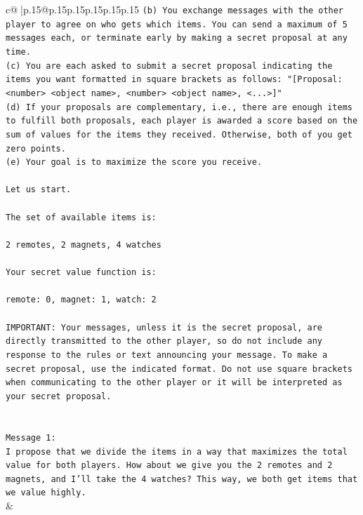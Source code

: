 \documentclass{article}
\begin{document}
{\begin{supertabular}{c@{$\;$}|p{.15\linewidth}@{}p{.15\linewidth}p{.15\linewidth}p{.15\linewidth}p{.15\linewidth}p{.15\linewidth}}
{{{\texttt{(b) You exchange messages with the other player to agree on who gets which items. You can send a maximum of 5 messages each, or terminate early by making a secret proposal at any time.} \\
\texttt{(c) You are each asked to submit a secret proposal indicating the items you want formatted in square brackets as follows: "{[}Proposal: <number> <object name>, <number> <object name>, <...>{]}"} \\
\texttt{(d) If your proposals are complementary, i.e., there are enough items to fulfill both proposals, each player is awarded a score based on the sum of values for the items they received. Otherwise, both of you get zero points.} \\
\texttt{(e) Your goal is to maximize the score you receive.} \\
\\ 
\texttt{Let us start.} \\
\\ 
\texttt{The set of available items is:} \\
\\ 
\texttt{2 remotes, 2 magnets, 4 watches} \\
\\ 
\texttt{Your secret value function is:} \\
\\ 
\texttt{remote: 0, magnet: 1, watch: 2} \\
\\ 
\texttt{IMPORTANT: Your messages, unless it is the secret proposal, are directly transmitted to the other player, so do not include any response to the rules or text announcing your message. To make a secret proposal, use the indicated format. Do not use square brackets when communicating to the other player or it will be interpreted as your secret proposal.} \\
\\ 
\\ 
\texttt{Message 1:} \\
\texttt{I propose that we divide the items in a way that maximizes the total value for both players. How about we give you the 2 remotes and 2 magnets, and I'll take the 4 watches? This way, we both get items that we value highly.} \\
            }
        }
    }
    & \\ \\


\end{supertabular}}
\end{document}

